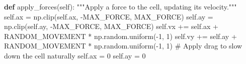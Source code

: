\documentclass[
  letterpaper,
  DIV=11,
  numbers=noendperiod]{scrreprt}
\newenvironment{Shaded}{\begin{snugshade}}{\end{snugshade}}
\newcommand{\CommentTok}[1]{\textcolor[rgb]{0.37,0.37,0.37}{#1}}
\newcommand{\DecValTok}[1]{\textcolor[rgb]{0.68,0.00,0.00}{#1}}
\newcommand{\KeywordTok}[1]{\textcolor[rgb]{0.00,0.23,0.31}{\textbf{#1}}}
\newcommand{\NormalTok}[1]{\textcolor[rgb]{0.00,0.23,0.31}{#1}}
\newcommand{\OperatorTok}[1]{\textcolor[rgb]{0.37,0.37,0.37}{#1}}
\newcommand{\VariableTok}[1]{\textcolor[rgb]{0.07,0.07,0.07}{#1}}
\theoremstyle{definition}
\theoremstyle{remark}
\begin{document}
\begin{tcolorbox}
\begin{Shaded}
\begin{Highlighting}[]
    \KeywordTok{def}\NormalTok{ apply\_forces(}\VariableTok{self}\NormalTok{):}
        \CommentTok{"""Apply a force to the cell, updating its velocity."""}
        \VariableTok{self}\NormalTok{.ax }\OperatorTok{=}\NormalTok{ np.clip(}\VariableTok{self}\NormalTok{.ax, }\OperatorTok{{-}}\NormalTok{MAX\_FORCE, MAX\_FORCE)}
        \VariableTok{self}\NormalTok{.ay }\OperatorTok{=}\NormalTok{ np.clip(}\VariableTok{self}\NormalTok{.ay, }\OperatorTok{{-}}\NormalTok{MAX\_FORCE, MAX\_FORCE)}
        \VariableTok{self}\NormalTok{.vx }\OperatorTok{+=} \VariableTok{self}\NormalTok{.ax }\OperatorTok{+}\NormalTok{ RANDOM\_MOVEMENT }\OperatorTok{*}\NormalTok{ np.random.uniform(}\OperatorTok{{-}}\DecValTok{1}\NormalTok{, }\DecValTok{1}\NormalTok{)}
        \VariableTok{self}\NormalTok{.vy }\OperatorTok{+=} \VariableTok{self}\NormalTok{.ay }\OperatorTok{+}\NormalTok{ RANDOM\_MOVEMENT }\OperatorTok{*}\NormalTok{ np.random.uniform(}\OperatorTok{{-}}\DecValTok{1}\NormalTok{, }\DecValTok{1}\NormalTok{)}
        \CommentTok{\# Apply drag to slow down the cell naturally}
        \VariableTok{self}\NormalTok{.ax }\OperatorTok{=} \DecValTok{0}
        \VariableTok{self}\NormalTok{.ay }\OperatorTok{=} \DecValTok{0}
        



\end{Highlighting}
\end{Shaded}
\end{tcolorbox}
\end{document}
